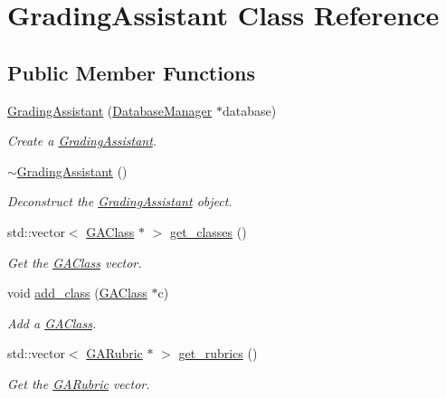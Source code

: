 \hypertarget{class_grading_assistant}{}\section{Grading\+Assistant Class Reference}
\label{class_grading_assistant}
\subsection*{Public Member Functions}
\begin{DoxyCompactItemize}
\item 
\hyperlink{class_grading_assistant_af3831409f51b90db892b366527742f01}{Grading\+Assistant} (\hyperlink{class_database_manager}{Database\+Manager} $\ast$database)
\begin{DoxyCompactList}\small\item\em Create a \hyperlink{class_grading_assistant}{Grading\+Assistant}. \end{DoxyCompactList}\item 
\hyperlink{class_grading_assistant_a8bc628e497b2f818fdc97c2e8eb5e26f}{$\sim$\+Grading\+Assistant} ()
\begin{DoxyCompactList}\small\item\em Deconstruct the \hyperlink{class_grading_assistant}{Grading\+Assistant} object. \end{DoxyCompactList}\item 
std\+::vector$<$ \hyperlink{class_g_a_class}{G\+A\+Class} $\ast$ $>$ \hyperlink{class_grading_assistant_af386f98b366cae34c8761f8c133f9eb9}{get\+\_\+classes} ()
\begin{DoxyCompactList}\small\item\em Get the \hyperlink{class_g_a_class}{G\+A\+Class} vector. \end{DoxyCompactList}\item 
void \hyperlink{class_grading_assistant_a5bbda42e70ff9c9a7fe9cadcf58681bd}{add\+\_\+class} (\hyperlink{class_g_a_class}{G\+A\+Class} $\ast$c)
\begin{DoxyCompactList}\small\item\em Add a \hyperlink{class_g_a_class}{G\+A\+Class}. \end{DoxyCompactList}\item 
std\+::vector$<$ \hyperlink{class_g_a_rubric}{G\+A\+Rubric} $\ast$ $>$ \hyperlink{class_grading_assistant_a05211ce3152422e668e6afeb5f9726bb}{get\+\_\+rubrics} ()
\begin{DoxyCompactList}\small\item\em Get the \hyperlink{class_g_a_rubric}{G\+A\+Rubric} vector. \end{DoxyCompactList}\item 

\end{DoxyCompactItemize}
